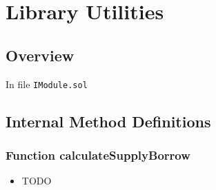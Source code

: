 
\chapter{Library Utilities}

\minitoc

\section{Overview}


In file {\tt IModule.sol}

\section{Internal Method Definitions}


\subsection{Function calculateSupplyBorrow}

\noindent\begin{itemize}
\item TODO
\end{itemize}

